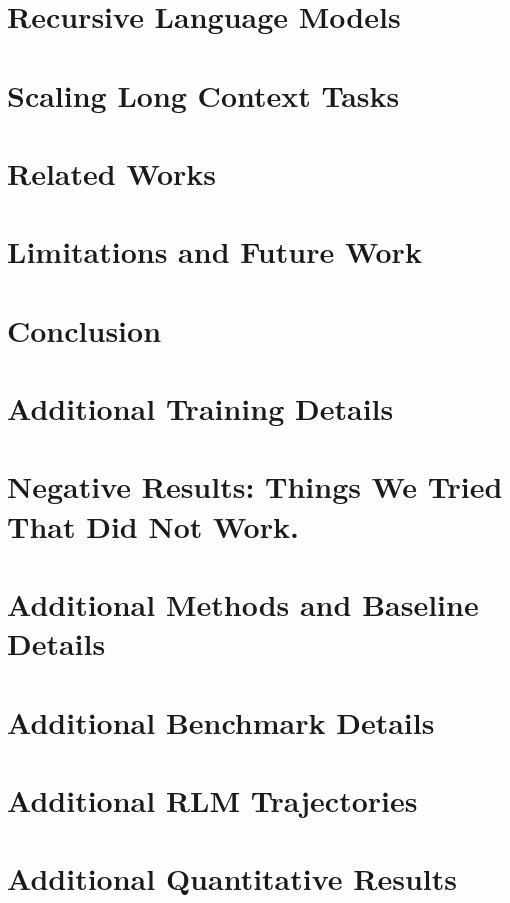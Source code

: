 \documentclass{article} %
\newcommand{\RLM}{RLM}
\begin{document}
\section{Recursive Language Models} \label{sec3:rlm}



\section{Scaling Long Context Tasks} \label{sec4:long-input}



\section{Related Works} \label{sec6:related-works}


\section{Limitations and Future Work} \label{sec7:limitations-future}


\section{Conclusion} \label{sec7:conclusion}







\newpage 

\appendix
\onecolumn
\section{Additional Training Details} \label{appx5:training}


\section{Negative Results: Things We Tried That Did Not Work.} \label{appx0:didnt-work}


\newpage
\section{Additional Methods and Baseline Details} \label{appx3:methods}



\section{Additional Benchmark Details} \label{appx4:benchmarks}


\pagebreak
\section{Additional \RLM{} Trajectories} \label{appx2:examples}


\pagebreak
\section{Additional Quantitative Results} \label{appx1:runtime-cost}

\end{document}
